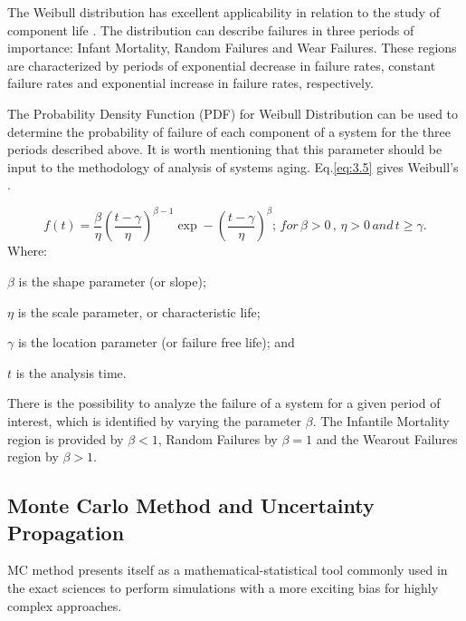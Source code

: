 \documentclass{ws-m3as}
\begin{document}
The Weibull distribution has excellent applicability in relation to the study of component life \cite{Lai2006}. The distribution can describe failures in three periods of importance: Infant Mortality, Random Failures and Wear Failures. These regions are characterized by periods of exponential decrease in failure rates, constant failure rates and exponential increase in failure rates, respectively.

The Probability Density Function (PDF) for Weibull Distribution can be used to determine the probability of failure of each component of a system for the three periods described above. It is worth mentioning that this parameter should be input to the methodology of analysis of systems aging. Eq.\ref{eq:3.5} gives Weibull's \cite{Rinne2008}.

\begin{equation}\label{eq:3.5}
f(t)=\frac{\beta}{\eta}\left(\frac{t-\gamma}{\eta}\right)^{\beta-1}\exp-\left(\frac{t-\gamma}{\eta}\right)^{\beta}; \hspace{2pt} for \hspace{2pt} \beta > 0\hspace{2pt},\hspace{2pt} \eta > 0 \hspace{2pt} and \hspace{2pt} t \geq \gamma.
\end{equation}
Where:
\begin{itemlist}
\item $\beta$ is the shape parameter (or slope);
\item $\eta$ is the scale parameter, or characteristic life;
\item $\gamma$ is the location parameter (or failure free life); and
\item $t$ is the analysis time.
\end{itemlist}	

There is the possibility to analyze the failure of a system for a given period of interest, which is identified by varying the parameter $\beta$. The Infantile Mortality  region is provided by $\beta<1$, Random Failures by $\beta=1$ and the Wearout Failures region by $\beta>1$. 

\subsection{Monte Carlo Method and Uncertainty Propagation}

MC method presents itself as a mathematical-statistical tool commonly used in the exact sciences to perform simulations \cite{Yoriyaz2009}  with a more exciting bias for highly complex approaches.
\end{document}
